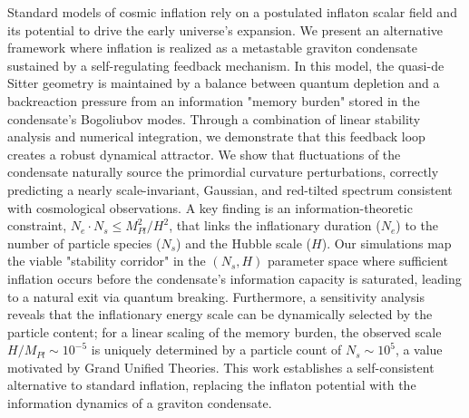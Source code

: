 \documentclass[]{article}
\begin{document}
Standard models of cosmic inflation rely on a postulated inflaton scalar field and its potential to drive the early universe's expansion. We present an alternative framework where inflation is realized as a metastable graviton condensate sustained by a self-regulating feedback mechanism. In this model, the quasi-de Sitter geometry is maintained by a balance between quantum depletion and a backreaction pressure from an information "memory burden" stored in the condensate's Bogoliubov modes. Through a combination of linear stability analysis and numerical integration, we demonstrate that this feedback loop creates a robust dynamical attractor. We show that fluctuations of the condensate naturally source the primordial curvature perturbations, correctly predicting a nearly scale-invariant, Gaussian, and red-tilted spectrum consistent with cosmological observations. A key finding is an information-theoretic constraint, $N_e \cdot N_s \leq M_{Pl}^2/H^2$, that links the inflationary duration ($N_e$) to the number of particle species ($N_s$) and the Hubble scale ($H$). Our simulations map the viable "stability corridor" in the $(N_s, H)$ parameter space where sufficient inflation occurs before the condensate's information capacity is saturated, leading to a natural exit via quantum breaking. Furthermore, a sensitivity analysis reveals that the inflationary energy scale can be dynamically selected by the particle content; for a linear scaling of the memory burden, the observed scale $H/M_{Pl} \sim 10^{-5}$ is uniquely determined by a particle count of $N_s \sim 10^5$, a value motivated by Grand Unified Theories. This work establishes a self-consistent alternative to standard inflation, replacing the inflaton potential with the information dynamics of a graviton condensate.
\end{document}
